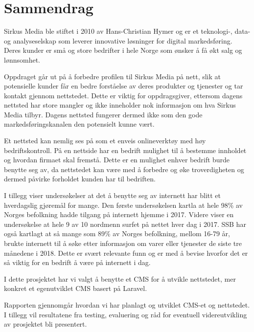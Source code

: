\cleardoublepage

 \setcounter{page}{1}
\chapter*{Sammendrag}

Sirkus Media ble stiftet i 2010 av Hans-Christian Hymer og er et teknologi-, data- og analyseselskap som leverer innovative løsninger for digital markedsføring. Deres kunder er små og store bedrifter i hele Norge som ønsker å få økt salg og lønnsomhet. 

Oppdraget går ut på å forbedre profilen til Sirkus Media på nett, slik at potensielle kunder får en bedre forståelse av deres produkter og tjenester og tar kontakt gjennom nettstedet. Dette er viktig for oppdragsgiver, ettersom dagens nettsted har store mangler og ikke inneholder nok informasjon om hva Sirkus Media tilbyr. Dagens nettsted fungerer dermed ikke som den gode markedsføringskanalen den potensielt kunne vært. 

Et nettsted kan nemlig ses på som et enveis onlineverktøy med høy bedriftskontroll. På en nettside har en bedrift mulighet til å bestemme innholdet og hvordan firmaet skal fremstå. Dette er en mulighet enhver bedrift burde benytte seg av, da nettstedet kan være med å forbedre og øke troverdigheten og dermed påvirke forholdet kunden har til bedriften.

I tillegg viser undersøkelser at det å benytte seg av internett har blitt et hverdagslig gjøremål for mange. Den første undersøkelsen kartla at hele 98\% av Norges befolkning hadde tilgang på internett hjemme i 2017. Videre viser en undersøkelse at hele 9 av 10 nordmenn surfet på nettet hver dag i 2017. SSB har også kartlagt  at så mange som 89\% av Norges befolkning, mellom 16-79 år, brukte internett til å søke etter informasjon om varer eller tjenester de siste tre månedene i 2018. Dette er svært relevante funn og er med å bevise hvorfor det er så viktig for en bedrift å være på internett i dag.

I dette prosjektet har vi valgt å benytte et CMS for å utvikle nettstedet, mer konkret et egenutviklet CMS basert på Laravel.

Rapporten gjennomgår hvordan vi har planlagt og utviklet CMS-et og nettstedet. I tillegg vil resultatene fra testing, evaluering og råd for eventuell videreutvikling av prosjektet bli presentert.